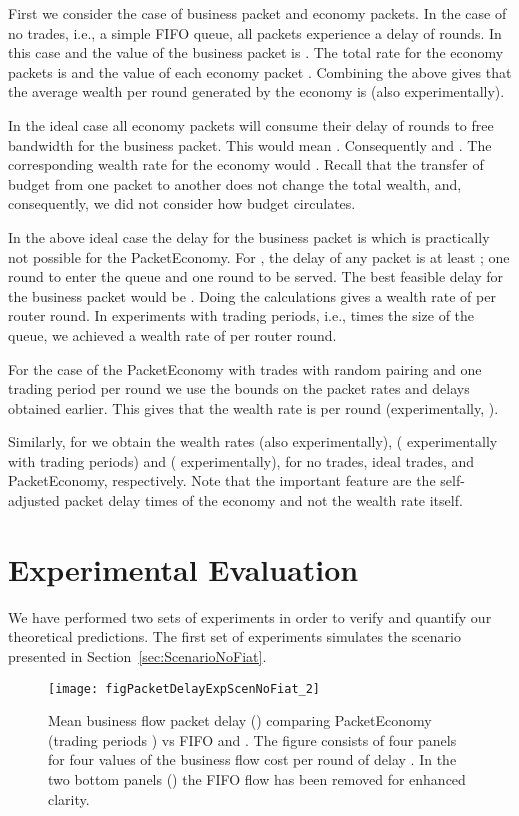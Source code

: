 \documentclass[letterpaper,10pt]{llncs}
\newcommand{\hla}[1]{\hl{#1}}
\renewcommand{\hla}[1]{#1}
\begin{document}
\hla{First we consider the case of  business packet and  economy packets.
In the case of no trades, i.e., a simple FIFO queue, all packets experience a delay 
of  rounds. 
In this case  and the value of the business packet is .
The total rate for the economy packets is  and the value of each 
economy packet . Combining the above gives that the average wealth per 
round generated by the economy is  (also  experimentally). 

In the ideal case all economy packets will consume their delay of  rounds
to free bandwidth for the business packet. This would mean
. Consequently 
and . The corresponding wealth rate for the economy 
would . Recall that the transfer of budget from one packet to another 
does not change the total wealth, and, consequently,
we did not consider how budget circulates.

In the above ideal case the delay for the business packet is 
which is practically not possible for the PacketEconomy. For , the delay 
of any packet is at least ; one round to enter the queue and one round to be served. 
The best feasible delay for the business packet would be .
Doing the calculations gives a wealth rate of  per router round. 
In experiments with  trading periods, i.e.,  times the size of the queue, 
we achieved a wealth rate of  per router round.

For the case of the PacketEconomy with trades with random pairing and 
one trading period per round we use the bounds on the packet rates and
delays obtained earlier. This gives that the wealth rate is 
per round (experimentally, ).

Similarly, for  we obtain the wealth rates  (also  experimentally),  ( experimentally with  trading periods) and  ( experimentally), 
for no trades, ideal trades, and PacketEconomy, respectively.
Note that the important feature are the self-adjusted packet delay times of 
the economy and not the wealth rate itself.
}

\section{Experimental Evaluation}
\label{sec:exp}

We have performed \hla{two} sets of experiments in order to verify and quantify our theoretical predictions. The first set of experiments simulates the scenario presented in Section~\ref{sec:ScenarioNoFiat}.


\begin{figure}[h!]
\centering
\texttt{[image: figPacketDelayExpScenNoFiat\_2]}
\caption{Mean business flow packet delay () comparing PacketEconomy (trading periods ) vs FIFO and . The figure consists of four panels for four values of the business flow cost per round of delay . In the two bottom panels () the FIFO flow has been removed for enhanced clarity.}
\label{fig:ExpDelay}
\end{figure}
\end{document}
